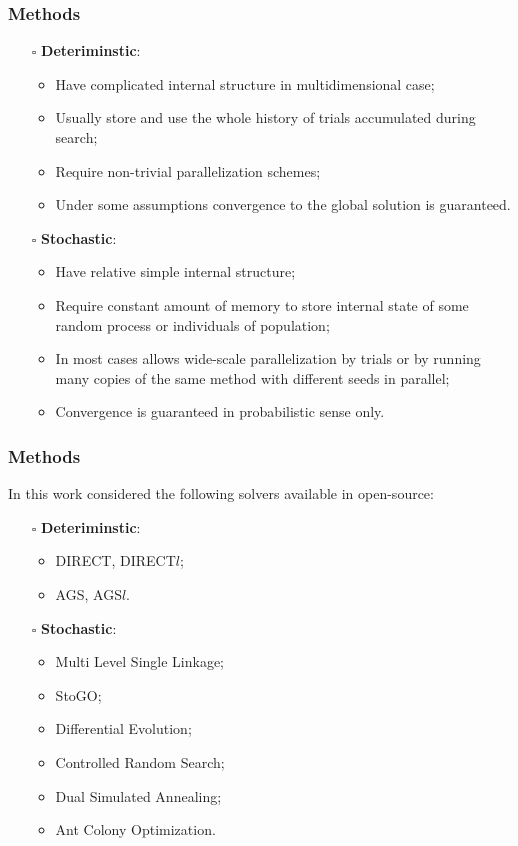 \documentclass[aspectratio=1610]{beamer}
\begin{document}
\begin{frame}
  \frametitle{Methods}
  \begin{itemize}
    \item[$\square$] \textbf{Deteriminstic}:
    \begin{itemize}
      \item Have complicated internal structure in multidimensional case;
      \item Usually store and use the whole history of trials accumulated during search;
      \item Require non-trivial parallelization schemes;
      \item Under some assumptions convergence to the global solution is guaranteed.
    \end{itemize}
    \item[$\square$] \textbf{Stochastic}:
    \begin{itemize}
      \item Have relative simple internal structure;
      \item Require constant amount of memory to store internal state of some random process or individuals of population;
      \item In most cases allows wide-scale parallelization by trials or by running many copies of the same method
      with different seeds in parallel;
      \item Convergence is guaranteed in probabilistic sense only.
    \end{itemize}
  \end{itemize}
\end{frame}

\begin{frame}
  \frametitle{Methods}
  In this work considered the following solvers available in open-source:
  \begin{itemize}
    \item[$\square$] \textbf{Deteriminstic}:
    \begin{itemize}
      \item DIRECT, DIRECT$l$;
      \item AGS, AGS$l$.
    \end{itemize}
    \item[$\square$] \textbf{Stochastic}:
    \begin{itemize}
      \item Multi Level Single Linkage;
      \item StoGO;
      \item Differential Evolution;
      \item Controlled Random Search;
      \item Dual Simulated Annealing;
      \item Ant Colony Optimization.
    \end{itemize}
  \end{itemize}
\end{frame}
\end{document}
